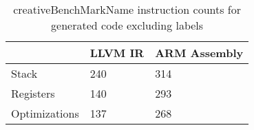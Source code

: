 \begin{table}[h!]
\centering
\begin{tabular}{p{}p{}p{}}
  \hline
 & LLVM IR & ARM Assembly \\ 
  \hline
Stack & 240 & 314 \\ 
  Registers & 140 & 293 \\ 
  Optimizations & 137 & 268 \\ 
   \hline
\end{tabular}
\caption{creativeBenchMarkName instruction counts for generated code excluding labels}
\end{table}
